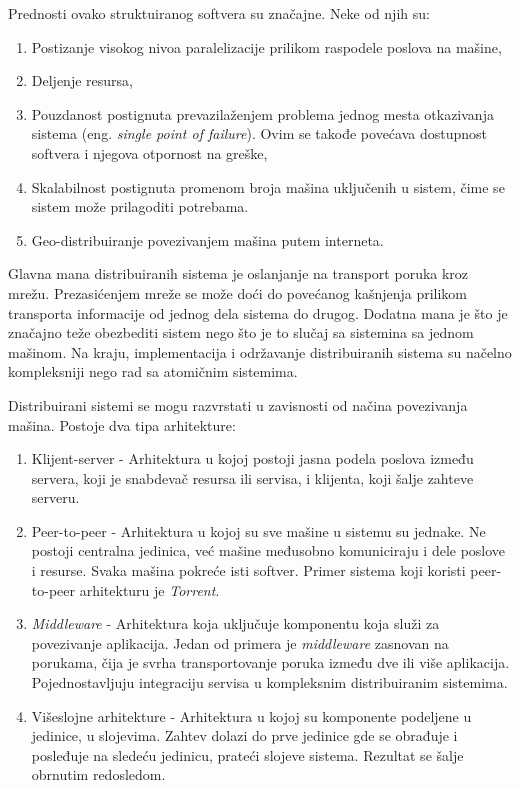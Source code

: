 \documentclass[12pt,oneside]{memoir}
\begin{document}
Prednosti ovako struktuiranog softvera su značajne. Neke od njih su:
\begin{enumerate}
\item Postizanje visokog nivoa paralelizacije prilikom raspodele poslova na mašine,
\item Deljenje resursa,
\item Pouzdanost postignuta prevazilaženjem problema jednog mesta otkazivanja sistema (eng. \emph{single point of failure}). Ovim se takođe povećava dostupnost softvera i njegova otpornost na greške,
\item Skalabilnost postignuta promenom broja mašina uključenih u sistem, čime se sistem može prilagoditi potrebama.
\item Geo-distribuiranje povezivanjem mašina putem interneta.
\end{enumerate}

Glavna mana distribuiranih sistema je oslanjanje na transport poruka kroz mrežu. Prezasićenjem mreže se može doći do povećanog kašnjenja prilikom transporta informacije od jednog dela sistema do drugog. Dodatna mana je što je značajno teže obezbediti sistem nego što je to slučaj sa sistemina sa jednom mašinom. Na kraju, implementacija i održavanje distribuiranih sistema su načelno kompleksniji nego rad sa atomičnim sistemima.

Distribuirani sistemi se mogu razvrstati u zavisnosti od načina povezivanja mašina. Postoje dva tipa arhitekture:
\begin{enumerate}
\item Klijent-server - Arhitektura u kojoj postoji jasna podela poslova između servera, koji je snabdevač resursa ili servisa, i klijenta, koji šalje zahteve serveru.
\item Peer-to-peer - Arhitektura u kojoj su sve mašine u sistemu su jednake. Ne postoji centralna jedinica, već mašine međusobno komuniciraju i dele poslove i resurse. Svaka mašina pokreće isti softver. Primer sistema koji koristi peer-to-peer arhitekturu je \emph{Torrent}.
\item \emph{Middleware} - Arhitektura koja uključuje komponentu koja služi za povezivanje aplikacija. Jedan od primera je \emph{middleware} zasnovan na porukama, čija je svrha transportovanje poruka između dve ili više aplikacija. Pojednostavljuju integraciju servisa u kompleksnim distribuiranim sistemima.
\item Višeslojne arhitekture - Arhitektura u kojoj su komponente podeljene u jedinice, u slojevima. Zahtev dolazi do prve jedinice gde se obrađuje i posleđuje na sledeću jedinicu, prateći slojeve sistema. Rezultat se šalje obrnutim redosledom.
\end{enumerate}
\end{document}
